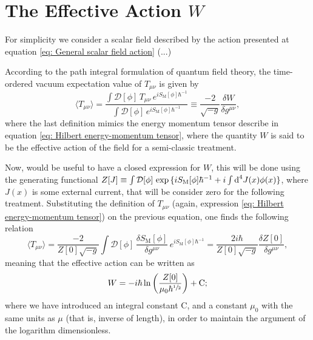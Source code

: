 \section{The Effective Action $W$}
For simplicity we consider a scalar field described by the action presented at equation \ref{eq: General scalar field action} (...)

According to the path integral formulation of quantum field theory, the time-ordered vacuum expectation value of $T_{\mu\nu}$ is given by
\begin{equation}
	\langle T_{\mu\nu}\rangle =\frac{\int \mathcal{D}[\phi]\,T_{\mu\nu}\,e^{iS_\text{M}[\phi]\hbar^{-1}}}{\int \mathcal{D}[\phi]\,e^{iS_\text{M}[\phi]\hbar^{-1}}}\equiv \frac{-2}{\sqrt{-g}}\frac{\delta W}{\delta g^{\mu\nu}},
\end{equation}
where the last definition mimics the energy momentum tensor describe in equation \ref{eq: Hilbert energy-momentum tensor}, where the quantity $W$ is said to be the effective action of the field for a semi-classic treatment.

 Now, would be useful to have a closed expression for $W$, this will be done using the generating functional 
$Z[J]\equiv \int \mathcal{D}[\phi]\,\exp{\{iS_\text{M}[\phi]\hbar^{-1}+i\int\text{d}^4J(x)\phi(x)\}}$, where $J(x)$ is some external current, that will be consider zero for the following treatment. Substituting the definition of $T_{\mu\nu}$ (again, expression \ref{eq: Hilbert energy-momentum tensor}) on the previous equation, one finds the following relation
\begin{equation}
	\langle T_{\mu\nu}\rangle=\frac{-2}{Z[0]\sqrt{-g}}\int \mathcal{D}[\phi]\,\frac{\delta S_\text{M}[\phi]}{\delta g^{\mu\nu}}\,e^{iS_\text{M}[\phi]\hbar^{-1}}=\frac{2i\hbar}{Z[0]\sqrt{-g}}\frac{\delta Z[0]}{\delta g^{\mu\nu}},
\end{equation}
meaning that the effective action can be written as
\begin{equation}\label{eq: Effective Action Z[0]}
	W=-i\hbar \ln\left( \frac{Z[0]}{\mu_0\hbar^{\sfrac{1}{2}}}\right)+\text{C};
\end{equation}
where we have introduced an integral constant C, and a constant $\mu_0$ with the same units as $\mu$ (that is, inverse of length), in order to maintain the argument of the logarithm dimensionless.

